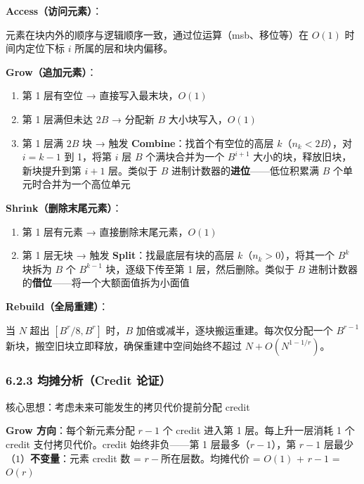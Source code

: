 \documentclass[
  UTF8,
  a4paper,
  12pt]{ctexart}
\providecommand{\tightlist}{%
  \setlength{\itemsep}{0pt}\setlength{\parskip}{0pt}}
\begin{document}
\textbf{Access（访问元素）}：

元素在块内外的顺序与逻辑顺序一致，通过位运算（msb、移位等）在 \(O(1)\)
时间内定位下标 \(i\) 所属的层和块内偏移。

\textbf{Grow（追加元素）}：

\begin{enumerate}
\def\labelenumi{\arabic{enumi}.}
\tightlist
\item
  第 1 层有空位 → 直接写入最末块，\(O(1)\)
\item
  第 1 层满但未达 \(2B\) → 分配新 \(B\) 大小块写入，\(O(1)\)
\item
  第 1 层满 \(2B\) 块 → 触发 \textbf{Combine}：找首个有空位的高层
  \(k\)（\(n_k < 2B\)），对 \(i = k-1\) 到 1，将第 \(i\) 层 \(B\)
  个满块合并为一个 \(B^{i+1}\) 大小的块，释放旧块，新块提升到第 \(i+1\)
  层。类似于 \(B\) 进制计数器的\textbf{进位}------低位积累满 \(B\)
  个单元时合并为一个高位单元
\end{enumerate}

\textbf{Shrink（删除末尾元素）}：

\begin{enumerate}
\def\labelenumi{\arabic{enumi}.}
\tightlist
\item
  第 1 层有元素 → 直接删除末尾元素，\(O(1)\)
\item
  第 1 层无块 → 触发 \textbf{Split}：找最底层有块的高层
  \(k\)（\(n_k > 0\)），将其一个 \(B^k\) 块拆为 \(B\) 个 \(B^{k-1}\)
  块，逐级下传至第 1 层，然后删除。类似于 \(B\)
  进制计数器的\textbf{借位}------将一个大额面值拆为小面值
\end{enumerate}

\textbf{Rebuild（全局重建）}：

当 \(N\) 超出 \([B^r/8, B^r]\) 时，\(B\)
加倍或减半，逐块搬运重建。每次仅分配一个 \(B^{r-1}\)
新块，搬空旧块立即释放，确保重建中空间始终不超过 \(N + O(N^{1-1/r})\)。

\subsubsection{6.2.3 均摊分析（Credit
论证）}\label{ux5747ux644aux5206ux6790credit-ux8bbaux8bc1}

核心思想：考虑未来可能发生的拷贝代价提前分配 credit

\textbf{Grow 方向}：每个新元素分配 \(r-1\) 个 credit 进入第 1
层。每上升一层消耗 1 个 credit 支付拷贝代价。credit 始终非负------第 1
层最多（\(r-1\)），第 \(r-1\) 层最少（\(1\)）\textbf{不变量}：元素
credit 数 = \(r - \text{所在层数}\)。均摊代价 = \(O(1)\) + \(r-1\) =
\(O(r)\)
\end{document}

